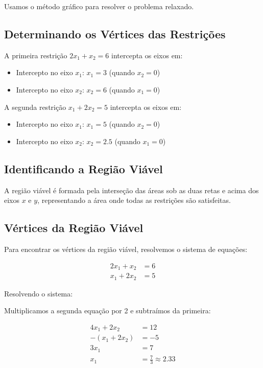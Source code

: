 \documentclass{article}
\begin{document}
Usamos o método gráfico para resolver o problema relaxado.

\subsection{Determinando os Vértices das Restrições}

A primeira restrição \(2x_1 + x_2 = 6\) intercepta os eixos em:
\begin{itemize}
    \item Intercepto no eixo \(x_1\): \(x_1 = 3\) (quando \(x_2 = 0\))
    \item Intercepto no eixo \(x_2\): \(x_2 = 6\) (quando \(x_1 = 0\))
\end{itemize}

A segunda restrição \(x_1 + 2x_2 = 5\) intercepta os eixos em:
\begin{itemize}
    \item Intercepto no eixo \(x_1\): \(x_1 = 5\) (quando \(x_2 = 0\))
    \item Intercepto no eixo \(x_2\): \(x_2 = 2.5\) (quando \(x_1 = 0\))
\end{itemize}

\subsection{Identificando a Região Viável}

A região viável é formada pela interseção das áreas sob as duas retas e acima dos eixos \(x\) e \(y\), representando a área onde todas as restrições são satisfeitas.

\subsection{Vértices da Região Viável}

Para encontrar os vértices da região viável, resolvemos o sistema de equações:

\begin{align}
2x_1 + x_2 & = 6 \\
x_1 + 2x_2 & = 5
\end{align}

Resolvendo o sistema:

Multiplicamos a segunda equação por 2 e subtraímos da primeira:

\begin{align}
4x_1 + 2x_2 & = 12 \\
-(x_1 + 2x_2) & = -5 \\
\hline
3x_1 & = 7 \\
x_1 & = \frac{7}{3} \approx 2.33
\end{align}
\end{document}
